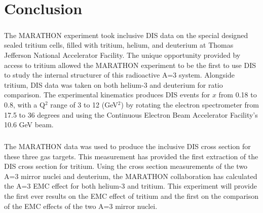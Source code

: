
\chapter{Conclusion}
\paragraph{}The MARATHON experiment took inclusive DIS data on the special designed sealed tritium cells, filled with tritium, helium, and deuterium at Thomas Jefferson National Accelerator Facility. The unique opportunity provided by access to tritium allowed the MARATHON experiment to be the first to use DIS to study the internal structurer of this radioactive A=3 system. Alongside tritium, DIS data was taken on both helium-3 and deuterium for ratio comparison. The experimental kinematics produces DIS events for $x$ from 0.18 to 0.8, with a Q$^2$ range of 3 to 12 (GeV$^2$) by rotating the electron spectrometer from 17.5 to 36 degrees and using the Continuous Electron Beam Accelerator Facility's 10.6 GeV beam. 
\paragraph{}The MARATHON data was used to produce the inclusive DIS cross section for these three gas targets. This measurement has provided the first extraction of the DIS cross section for tritium. Using the cross section measurements of the two A=3 mirror nuclei and deuterium, the MARATHON collaboration has calculated the A=3 EMC effect for both helium-3 and tritium. This experiment will provide the first ever results on the EMC effect of tritium and the first on the comparison of the EMC effects of the two A=3 mirror nuclei.
\paragraph{}